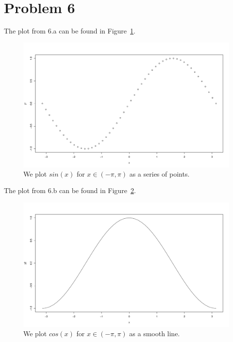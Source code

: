 \documentclass{amsart}
\begin{document}
\section{Problem 6}
The plot from 6.a can be found in Figure~\ref{fig:6_a}.
\begin{figure}[H]
  \centering
  \includegraphics[width=\textwidth]{problem_6_a.pdf}
  \caption{We plot $sin(x)$ for $x \in (-\pi, \pi)$ as
    a series of points.}
  \label{fig:6_a}
\end{figure}

\newpage
The plot from 6.b can be found in Figure~\ref{fig:6_b}.
\begin{figure}[H]
  \centering
  \includegraphics[width=\textwidth]{problem_6_b.pdf}
  \caption{We plot $cos(x)$ for $x \in (-\pi, \pi)$ as
    a smooth line.}
  \label{fig:6_b}
\end{figure}
\end{document}
